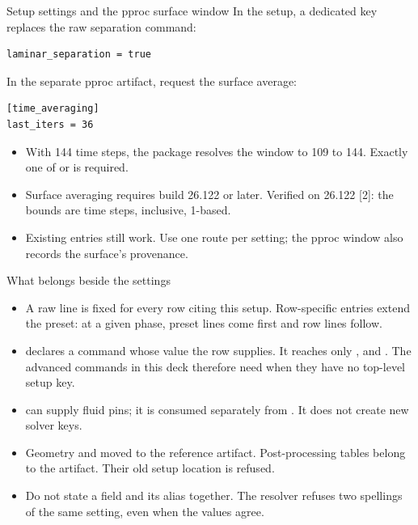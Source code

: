 \begin{frame}[fragile]{Setup settings and the pproc surface window}
\small In the setup, a dedicated key replaces the raw separation command:
\begin{lstlisting}[basicstyle=\ttfamily\small,numbers=none]
laminar_separation = true
\end{lstlisting}
\small In the separate pproc artifact, request the surface average:
\begin{lstlisting}[basicstyle=\ttfamily\small,numbers=none]
[time_averaging]
last_iters = 36
\end{lstlisting}
\begin{itemize}\small
  \item With 144 time steps, the package resolves the window to 109 to 144.
        Exactly one of  or  is required.
  \item Surface averaging requires build 26.122 or later. Verified on 26.122
        [2]: the bounds are time steps, inclusive, 1-based.
  \item Existing \code{[[raw]]} entries still work. Use one route per
        setting; the pproc window also records the surface's provenance.
\end{itemize}
\end{frame}

\begin{frame}{What belongs beside the settings}
\begin{itemize}\small
  \item A raw line is fixed for every row citing this setup. Row-specific
         entries extend the preset: at a given phase, preset
        lines come first and row lines follow.
  \item \code{[[flags]]} declares a command whose value the row supplies.
        It reaches only ,  and .
        The advanced  commands in this deck therefore need
        \code{[[raw]]} when they have no top-level setup key.
  \item {} can supply fluid pins; it is consumed
        separately from . It does not create new solver keys.
  \item Geometry \code{[aliases]} and \code{[[frames]]} moved to the
        reference artifact. Post-processing tables belong to the
         artifact. Their old setup location is refused.
  \item Do not state a field and its alias together. The resolver refuses
        two spellings of the same setting, even when the values agree.
\end{itemize}
\end{frame}
